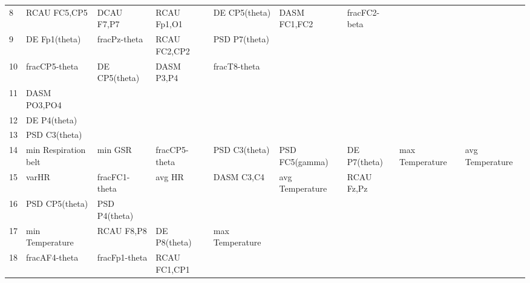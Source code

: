 \begin{landscape}
\begin{table}[]
\begin{tabular}{l|llllllll}
8                  & RCAU FC5,CP5         & DCAU F7,P7              & RCAU Fp1,O1          & DE CP5(theta)      & DASM FC1,FC2          & fracFC2-beta         &                 &                 \\
9                  & DE Fp1(theta)        & fracPz-theta            & RCAU FC2,CP2         & PSD P7(theta)      &                       &                      &                 &                 \\
10                 & fracCP5-theta        & DE CP5(theta)           & DASM P3,P4           & fracT8-theta       &                       &                      &                 &                 \\
11                 & DASM PO3,PO4         &                         &                      &                    &                       &                      &                 &                 \\
12                 & DE P4(theta)         &                         &                      &                    &                       &                      &                 &                 \\
13                 & PSD C3(theta)        &                         &                      &                    &                       &                      &                 &                 \\
14                 & min Respiration belt & min GSR                 & fracCP5-theta        & PSD C3(theta)      & PSD FC5(gamma)        & DE P7(theta)         & max Temperature & avg Temperature \\
15                 & varHR                & fracFC1-theta           & avg HR               & DASM C3,C4         & avg Temperature       & RCAU Fz,Pz           &                 &                 \\
16                 & PSD CP5(theta)       & PSD P4(theta)           &                      &                    &                       &                      &                 &                 \\
17                 & min Temperature      & RCAU F8,P8              & DE P8(theta)         & max Temperature    &                       &                      &                 &                 \\
18                 & fracAF4-theta        & fracFp1-theta           & RCAU FC1,CP1         &                    &                       &                      &                 &                 \\

\end{tabular}
\end{table}
\end{landscape}
